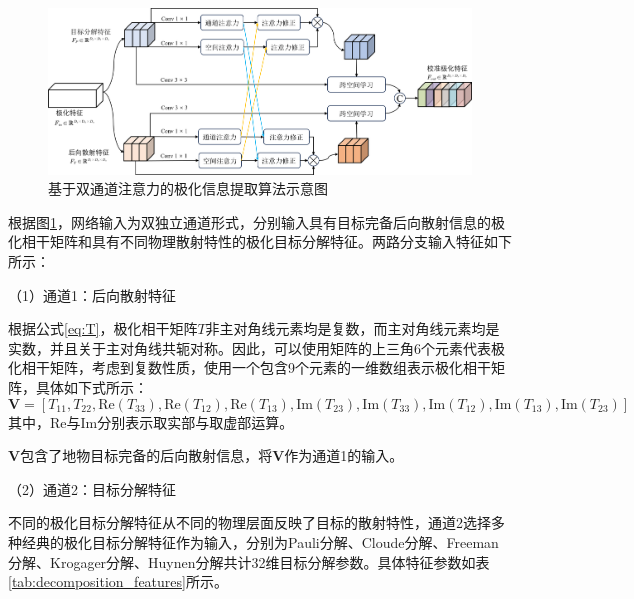 \begin{figure}[h]
    \centering
    \includegraphics[width=14cm]{pic/chapter3/DPEN_framework.png}
    \caption{基于双通道注意力的极化信息提取算法示意图}
    \label{DPEN_framework}
\end{figure}

根据图\ref{DPEN_framework}，网络输入为双独立通道形式，分别输入具有目标完备后向散射信息的极化相干矩阵和具有不同物理散射特性的极化目标分解特征。两路分支输入特征如下所示：

（1）通道1：后向散射特征

根据公式\ref{eq:T}，极化相干矩阵$T$非主对角线元素均是复数，而主对角线元素均是实数，并且关于主对角线共轭对称。因此，可以使用矩阵的上三角6个元素代表极化相干矩阵，考虑到复数性质，使用一个包含9个元素的一维数组表示极化相干矩阵，具体如下式所示：
\begin{equation}
    \mathbf{V}=[T_{11}, T_{22}, \text{Re}(T_{33}), \text{Re}(T_{12}), \text{Re}(T_{13}), \text{Im}(T_{23}), \text{Im}(T_{33}), \text{Im}(T_{12}), \text{Im}(T_{13}), \text{Im}(T_{23})]
\end{equation}
其中，$\text{Re}$与$\text{Im}$分别表示取实部与取虚部运算。

$\mathbf{V}$包含了地物目标完备的后向散射信息，将$\mathbf{V}$作为通道1的输入。

（2）通道2：目标分解特征

不同的极化目标分解特征从不同的物理层面反映了目标的散射特性，通道2选择多种经典的极化目标分解特征作为输入，分别为Pauli分解、Cloude分解、Freeman分解、Krogager分解、Huynen分解共计32维目标分解参数。具体特征参数如表\ref{tab:decomposition_features}所示。

